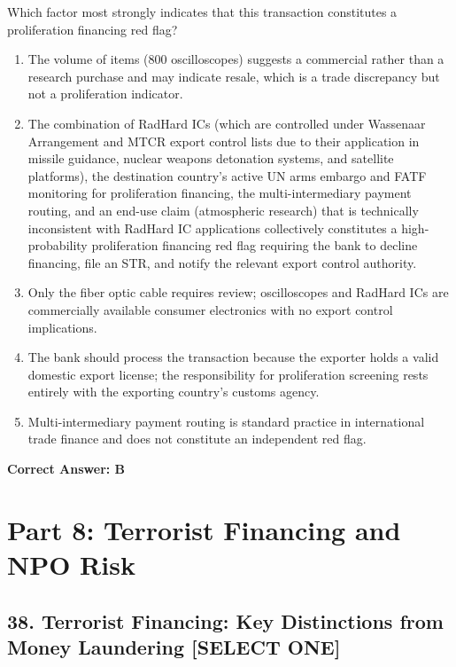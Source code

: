 \documentclass[11pt,a4paper]{article}
\begin{document}
	Which factor most strongly indicates that this transaction constitutes a proliferation financing red flag?
	
	\begin{enumerate}[label=\Alph*.]
		\item The volume of items (800 oscilloscopes) suggests a commercial rather than a research purchase and may indicate resale, which is a trade discrepancy but not a proliferation indicator.
		\item The combination of RadHard ICs (which are controlled under Wassenaar Arrangement and MTCR export control lists due to their application in missile guidance, nuclear weapons detonation systems, and satellite platforms), the destination country's active UN arms embargo and FATF monitoring for proliferation financing, the multi-intermediary payment routing, and an end-use claim (atmospheric research) that is technically inconsistent with RadHard IC applications collectively constitutes a high-probability proliferation financing red flag requiring the bank to decline financing, file an STR, and notify the relevant export control authority.
		\item Only the fiber optic cable requires review; oscilloscopes and RadHard ICs are commercially available consumer electronics with no export control implications.
		\item The bank should process the transaction because the exporter holds a valid domestic export license; the responsibility for proliferation screening rests entirely with the exporting country's customs agency.
		\item Multi-intermediary payment routing is standard practice in international trade finance and does not constitute an independent red flag.
	\end{enumerate}
	\textbf{Correct Answer: B}
	
	\section{Part 8: Terrorist Financing and NPO Risk}
	
	\subsection{38. Terrorist Financing: Key Distinctions from Money Laundering \textnormal{[SELECT ONE]}}
	
\end{document}
